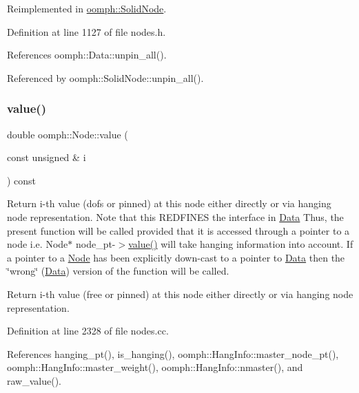 Reimplemented in \hyperlink{classoomph_1_1SolidNode_a0df372aae692d679cfceeb46fb5783a9}{oomph\+::\+Solid\+Node}.



Definition at line 1127 of file nodes.\+h.



References oomph\+::\+Data\+::unpin\+\_\+all().



Referenced by oomph\+::\+Solid\+Node\+::unpin\+\_\+all().

\mbox{\label{classoomph_1_1Node_afcc5cdba40bca251826ae5bee5ca15b4}} 
\subsubsection{\texorpdfstring{value()}{value()}\hspace{0.1cm}{\footnotesize\ttfamily [1/5]}}
{\footnotesize\ttfamily double oomph\+::\+Node\+::value (\begin{DoxyParamCaption}\item[{const unsigned \&}]{i }\end{DoxyParamCaption}) const}



Return i-\/th value (dofs or pinned) at this node either directly or via hanging node representation. Note that this R\+E\+D\+F\+I\+N\+ES the interface in \hyperlink{classoomph_1_1Data}{Data} Thus, the present function will be called provided that it is accessed through a pointer to a node i.\+e. Node$\ast$ node\+\_\+pt-\/$>$\hyperlink{classoomph_1_1Node_afcc5cdba40bca251826ae5bee5ca15b4}{value()} will take hanging information into account. If a pointer to a \hyperlink{classoomph_1_1Node}{Node} has been explicitly down-\/cast to a pointer to \hyperlink{classoomph_1_1Data}{Data} then the \char`\"{}wrong\char`\"{} (\hyperlink{classoomph_1_1Data}{Data}) version of the function will be called. 

Return i-\/th value (free or pinned) at this node either directly or via hanging node representation. 

Definition at line 2328 of file nodes.\+cc.



References hanging\+\_\+pt(), is\+\_\+hanging(), oomph\+::\+Hang\+Info\+::master\+\_\+node\+\_\+pt(), oomph\+::\+Hang\+Info\+::master\+\_\+weight(), oomph\+::\+Hang\+Info\+::nmaster(), and raw\+\_\+value().



